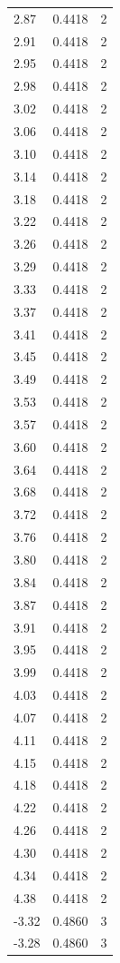 \begin{longtable}{lrr}
  2.87 & 0.4418 & 2 \\
  2.91 & 0.4418 & 2 \\
  2.95 & 0.4418 & 2 \\
  2.98 & 0.4418 & 2 \\
  3.02 & 0.4418 & 2 \\
  3.06 & 0.4418 & 2 \\
  3.10 & 0.4418 & 2 \\
  3.14 & 0.4418 & 2 \\
  3.18 & 0.4418 & 2 \\
  3.22 & 0.4418 & 2 \\
  3.26 & 0.4418 & 2 \\
  3.29 & 0.4418 & 2 \\
  3.33 & 0.4418 & 2 \\
  3.37 & 0.4418 & 2 \\
  3.41 & 0.4418 & 2 \\
  3.45 & 0.4418 & 2 \\
  3.49 & 0.4418 & 2 \\
  3.53 & 0.4418 & 2 \\
  3.57 & 0.4418 & 2 \\
  3.60 & 0.4418 & 2 \\
  3.64 & 0.4418 & 2 \\
  3.68 & 0.4418 & 2 \\
  3.72 & 0.4418 & 2 \\
  3.76 & 0.4418 & 2 \\
  3.80 & 0.4418 & 2 \\
  3.84 & 0.4418 & 2 \\
  3.87 & 0.4418 & 2 \\
  3.91 & 0.4418 & 2 \\
  3.95 & 0.4418 & 2 \\
  3.99 & 0.4418 & 2 \\
  4.03 & 0.4418 & 2 \\
  4.07 & 0.4418 & 2 \\
  4.11 & 0.4418 & 2 \\
  4.15 & 0.4418 & 2 \\
  4.18 & 0.4418 & 2 \\
  4.22 & 0.4418 & 2 \\
  4.26 & 0.4418 & 2 \\
  4.30 & 0.4418 & 2 \\
  4.34 & 0.4418 & 2 \\
  4.38 & 0.4418 & 2 \\
  -3.32 & 0.4860 & 3 \\
  -3.28 & 0.4860 & 3 \\

\end{longtable}
